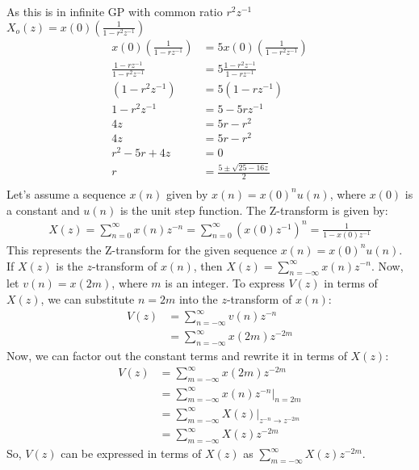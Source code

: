 \documentclass{article}
\begin{document}
As this is in infinite GP with common ratio $r^{2}z^{-1}$\\
$X_o(z)= x(0)\left(\frac{1}{1 - r^2z^{-1}}\right)$ \\
\begin{align}
x(0)\left(\frac{1}{1 - rz^{-1}}\right) &= 5 x(0)\left(\frac{1}{1 - r^2z^{-1}}\right) \\
\frac{1 - rz^{-1}}{1 - r^2z^{-1}} &= 5 \frac{1 - r^2z^{-1}}{1 - rz^{-1}} \\
(1 - r^2z^{-1}) &= 5 (1 - rz^{-1}) \\
1 - r^2z^{-1} &= 5 - 5rz^{-1} \\
4z &= 5r- r^2 \\
4z &= 5r- r^2 \\
r^2 - 5r + 4z &= 0 \\
r &= \frac{5\pm \sqrt{25- 16z}}{2}\\
\end{align}
Let's assume a sequence \( x(n) \) given by \( x(n) =x(0)^n u(n) \), where \( x(0) \) is a constant and \( u(n) \) is the unit step function.
The Z-transform is given by:
\begin{align}
X(z) = \sum_{n=0}^{\infty} x(n)z^{-n} = \sum_{n=0}^{\infty} (x(0)z^{-1})^n = \frac{1}{1 - x(0)z^{-1}} 
\end{align}
This represents the Z-transform for the given sequence \( x(n) = x(0)^n u(n) \).\\
If \(X(z)\) is the \(z\)-transform of \(x(n)\), then \(X(z) = \sum_{n=-\infty}^{\infty} x(n)z^{-n}\). Now, let \(v(n)=x(2m)\), where \(m\) is an integer.
To express \(V(z)\) in terms of \(X(z)\), we can substitute \(n=2m\) into the \(z\)-transform of \(x(n)\):
\begin{align}
V(z) & = \sum_{n=-\infty}^{\infty} v(n)z^{-n} \\
     & = \sum_{n=-\infty}^{\infty} x(2m)z^{-2m}
\end{align}
Now, we can factor out the constant terms and rewrite it in terms of \(X(z)\):
\begin{align}
V(z) & = \sum_{m=-\infty}^{\infty} x(2m)z^{-2m} \\
     & = \sum_{m=-\infty}^{\infty} x(n)z^{-n} \Bigg|_{n=2m} \\
     & = \sum_{m=-\infty}^{\infty} X(z) \Bigg|_{z^{-n} \rightarrow z^{-2m}} \\
     & = \sum_{m=-\infty}^{\infty} X(z)z^{-2m}
\end{align}
So, \(V(z)\) can be expressed in terms of \(X(z)\) as \(\sum_{m=-\infty}^{\infty} X(z)z^{-2m}\).
\end{document}
